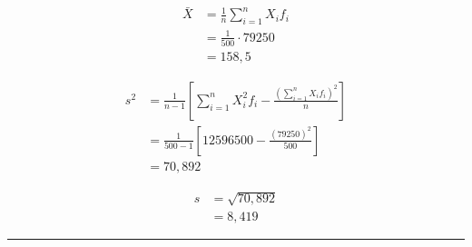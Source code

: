 \documentclass[a4paper,11pt,fleqn]{article}\usepackage[]{graphicx}\usepackage[]{color}
\theoremstyle{definition}
\begin{document}
\begin{compactenum}[7.]
\begin{align*}
  \bar{X} &= \frac{1}{n} \sum_{i=1}^{n} X_i f_i \\
  &= \frac{1}{500} \cdot 79250 \\
          &= 158,5
\end{align*}

\begin{align*}
  s^2 &= \frac{1}{n-1} \left[ \sum_{i=1}^{n} X_{i}^{2} f_i -
    \frac{(\sum_{i=1}^{n} X_{i} f_i)^2}{n} \right] \\
  &= \frac{1}{500-1} \left[ 12596500 - \frac{(79250)^2}{500} \right] \\
  &= 70,892
\end{align*}

\begin{align*}
  s &= \sqrt{70,892} \\
    &= 8,419
\end{align*}

\end{compactenum}

\vspace{0.3cm}
\hrule
\vspace{0.3cm}
\end{document}
